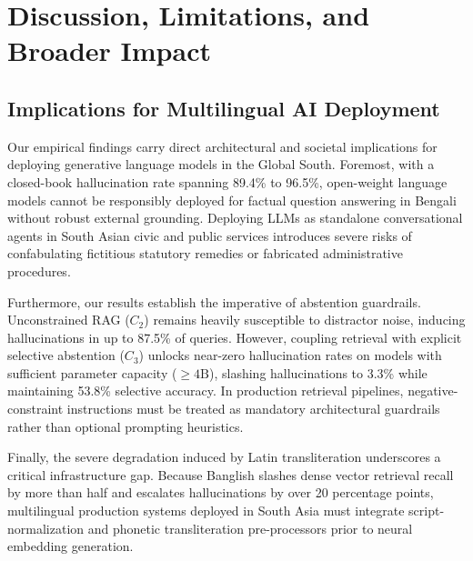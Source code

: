 \section{Discussion, Limitations, and Broader Impact}
\label{sec:discussion}

\subsection{Implications for Multilingual AI Deployment}
Our empirical findings carry direct architectural and societal implications for deploying generative language models in the Global South. Foremost, with a closed-book hallucination rate spanning 89.4\% to 96.5\%, open-weight language models cannot be responsibly deployed for factual question answering in Bengali without robust external grounding. Deploying LLMs as standalone conversational agents in South Asian civic and public services introduces severe risks of confabulating fictitious statutory remedies or fabricated administrative procedures.

Furthermore, our results establish the imperative of abstention guardrails. Unconstrained RAG ($C_2$) remains heavily susceptible to distractor noise, inducing hallucinations in up to 87.5\% of queries. However, coupling retrieval with explicit selective abstention ($C_3$) unlocks near-zero hallucination rates on models with sufficient parameter capacity ($\ge 4\text{B}$), slashing hallucinations to 3.3\% while maintaining 53.8\% selective accuracy. In production retrieval pipelines, negative-constraint instructions must be treated as mandatory architectural guardrails rather than optional prompting heuristics.

Finally, the severe degradation induced by Latin transliteration underscores a critical infrastructure gap. Because Banglish slashes dense vector retrieval recall by more than half and escalates hallucinations by over 20 percentage points, multilingual production systems deployed in South Asia must integrate script-normalization and phonetic transliteration pre-processors prior to neural embedding generation.

